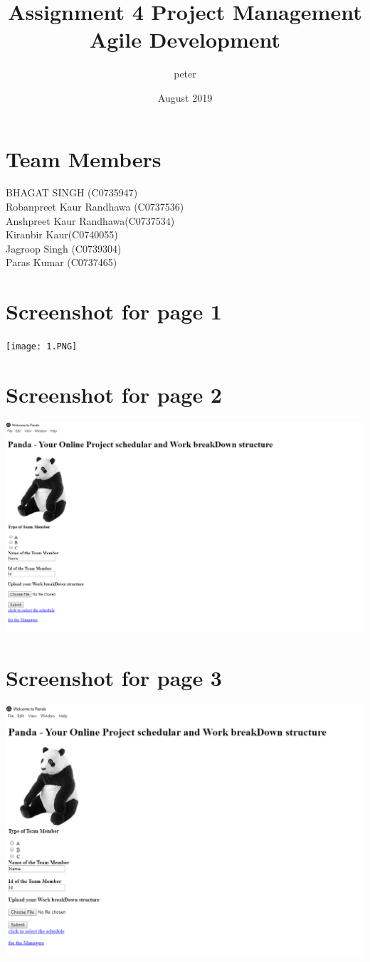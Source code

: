 \documentclass{article}
\title{Assignment 4 Project Management Agile Development}
\author{peter }
\date{August 2019}
\begin{document}
\maketitle

\section{Team Members}
BHAGAT SINGH (C0735947)\\
Robanpreet Kaur Randhawa  (C0737536)\\
Anshpreet Kaur Randhawa(C0737534)\\
Kiranbir Kaur(C0740055)\\
Jagroop Singh (C0739304)\\
Paras Kumar (C0737465)\\
\section *{Screenshot for page 1}
\texttt{[image: 1.PNG]}
\section *{Screenshot for page 2}
\includegraphics[width=20cm]{2.PNG}
\section *{Screenshot for page 3}
\includegraphics[width=20cm]{3.PNG}
\end{document}
